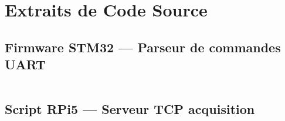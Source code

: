 \chapter{Extraits de Code Source}

\section{Firmware STM32 — Parseur de commandes UART}

\begin{lstlisting}[language=C, caption={Parseur de commandes UART — STM32 HAL}]
% TODO: inserer extrait firmware ici
\end{lstlisting}

\section{Script RPi5 — Serveur TCP acquisition}

\begin{lstlisting}[language=Python, caption={Serveur TCP RPi5 — acquisition image}]
%TODO: inserer extrait rpi5_server.py ici
\end{lstlisting}
